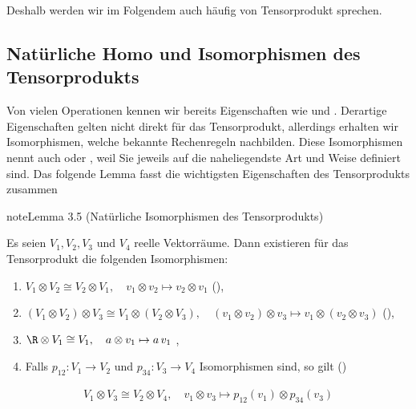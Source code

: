 \documentclass[letterpaper,10pt,german]{jupyterBook}
\begin{document}
\sphinxAtStartPar
Deshalb werden wir im Folgendem auch häufig von  Tensorprodukt sprechen.


\subsection{Natürliche Homo\sphinxhyphen{} und Isomorphismen des Tensorprodukts}
\label{\detokenize{vektoranalysis/tensor:naturliche-homo-und-isomorphismen-des-tensorprodukts}}
\sphinxAtStartPar
Von vielen Operationen kennen wir bereits Eigenschaften wie  und .
Derartige Eigenschaften gelten nicht direkt für das Tensorprodukt, allerdings erhalten wir Isomorphismen, welche bekannte Rechenregeln nachbilden.
Diese Isomorphismen nennt auch  oder , weil Sie jeweils auf die naheliegendste Art und Weise definiert sind.
Das folgende Lemma fasst die wichtigsten Eigenschaften des Tensorprodukts zusammen
\label{vektoranalysis/tensor:lem:natISO}
\begin{sphinxadmonition}{note}{Lemma 3.5 (Natürliche Isomorphismen des Tensorprodukts)}



\sphinxAtStartPar
Es seien \(V_1,V_2,V_3\) und \(V_4\) reelle Vektorräume.
Dann existieren für das Tensorprodukt die folgenden Isomorphismen:
\begin{enumerate}
%
\item {} 
\sphinxAtStartPar
\(V_1\otimes V_2 \cong V_2\otimes V_1, \quad v_1\otimes v_2 \mapsto v_2\otimes v_1\) (),

\item {} 
\sphinxAtStartPar
\((V_1\otimes V_2)\otimes V_3 \cong V_1 \otimes (V_2 \otimes V_3),\quad (v_1\otimes v_2)\otimes v_3 \mapsto v_1 \otimes (v_2\otimes v_3)\) (),

\item {} 
\sphinxAtStartPar
\(\R \otimes V_1 \cong V_1,\quad a\otimes v_1 \mapsto a\,v_1\) ,

\item {} 
\sphinxAtStartPar
Falls \(p_{12}:V_1\to V_2\) und \(p_{34}:V_3\to V_4\) Isomorphismen sind, so gilt ()

\end{enumerate}
\begin{equation*}
\begin{split}V_1\otimes V_3 \cong V_2\otimes V_4,\quad v_1\otimes v_3 \mapsto p_{12}(v_1)\otimes p_{34}(v_3)\end{split}
\end{equation*}\end{sphinxadmonition}
\end{document}
